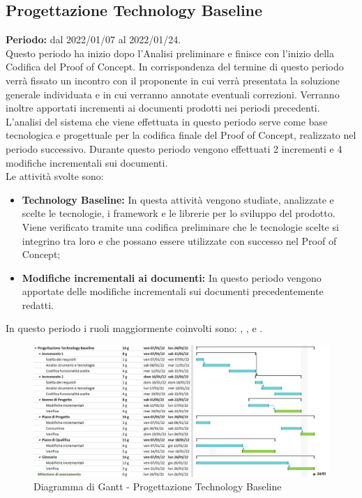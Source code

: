 \subsection{Progettazione Technology Baseline} \label{subsection:pianificazione_TB}
\textbf{Periodo:} dal 2022/01/07 al 2022/01/24.
\bigskip
\\Questo periodo ha inizio dopo l'Analisi preliminare e finisce con l'inizio della Codifica del Proof of Concept\glo{}.
In corrispondenza del termine di questo periodo verrà fissato un incontro con il proponente in cui verrà presentata la soluzione generale individuata e in cui verranno annotate eventuali correzioni.
Verranno inoltre apportati incrementi ai documenti prodotti nei periodi precedenti.
L'analisi del sistema che viene effettuata in questo periodo serve come base tecnologica e progettuale per la codifica finale del Proof of Concept\glo{}, realizzato nel periodo successivo.
Durante questo periodo vengono effettuati 2 incrementi e 4 modifiche incrementali sui documenti.
\\Le attività svolte sono:
\begin{itemize}
  \item \textbf{Technology Baseline:} In questa attività vengono studiate, analizzate e scelte le tecnologie, i framework e le librerie per lo sviluppo del prodotto.
        Viene verificato tramite una codifica preliminare che le tecnologie scelte si integrino tra loro e che possano essere utilizzate con successo nel Proof of Concept\glo{};
  \item \textbf{Modifiche incrementali ai documenti:} In questo periodo vengono apportate delle modifiche incrementali sui documenti precedentemente redatti.
\end{itemize}
In questo periodo i ruoli maggiormente coinvolti sono: \roleAdministratorLow{}, \roleAnalystLow{}, \roleDesignerLow{} e \roleVerifierLow{}.
\bigskip
\begin{figure}[H]
  \centering
  \includegraphics[scale=0.56]{immagini/technology_baseline.png}
  \caption{Diagramma di Gantt - Progettazione Technology Baseline}
\end{figure}
\pagebreak

